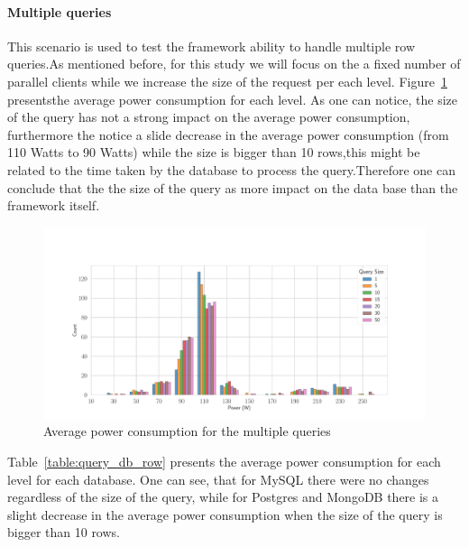\paragraph{Multiple queries}

This scenario is used to test the framework ability to handle multiple row queries.As mentioned before,  for this study we will focus on the a fixed number of parallel clients while we increase the size of the request per each level.
Figure~\ref{fig:av_power_query} presentsthe average power consumption for each level. As one can notice, the size of the query has not a strong impact on the average power consumption, furthermore the notice a slide decrease in the average power consumption (from 110 Watts to 90 Watts) while the size is bigger than 10 rows,this might be related to the time taken by the database to process the query.Therefore one can conclude that the the size of the query as more impact on the data base than the framework itself.
\begin{figure}[hbt]
    \centering
    \includegraphics[width=
        \columnwidth]{imgs/histogram_av_power_cpu_query}
    \caption{Average power consumption for the multiple queries }
    \label{fig:av_power_query}
\end{figure}
Table~\ref{table:query_db_row} presents the average power consumption for each level for each database. One can see, that for MySQL there were no changes regardless of the size of the query, while for Postgres and MongoDB there is a slight decrease in the average power consumption when the size of the query is bigger than 10 rows.



